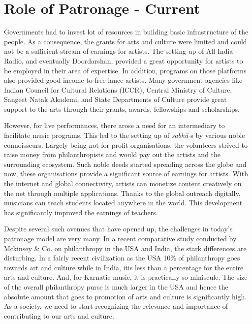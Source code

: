\vspace{-.3cm}

\section*{Role of Patronage - Current}

\vspace{-.2cm}

Governments had to invest lot of resources in building basic infrastructure of the people. As a consequence, the grants for arts and culture were limited and could not be a sufficient stream of earnings for artists. The setting up of All India Radio, and eventually Doordarshan, provided a great opportunity for artists to be employed in their area of expertise. In addition, programs on those platforms also provided good income to free-lance artists. Many government agencies like Indian Council for Cultural Relations (ICCR), Central Ministry of Culture, Sangeet Natak Akademi, and State Departments of Culture provide great support to the arts through their grants, awards, fellowships and scholarships.

However, for live performances, there arose a need for an intermediary to facilitate music programs. This led to the setting up of \textit{sabhā-}s by various noble connoisseurs. Largely being not-for-profit organisations, the volunteers strived to raise money from philanthropists and would pay out the artists and the surrounding ecosystem. Such noble deeds started spreading across the globe and now, these organisations provide a significant source of earnings for artists. With the internet and global connectivity, artists can monetize content creatively on the net through multiple applications. Thanks to the global outreach digitally, musicians can teach students located anywhere in the world. This development has significantly improved the earnings of teachers.

Despite several such avenues that have opened up, the challenges in today’s patronage model are very many. In a recent comparative study conducted by Mckinsey \& Co. on philanthropy in the USA and India, the stark differences are disturbing. In a fairly recent civilization as the USA 10\% of philanthropy goes towards art and culture while in India, itis less than a percentage for the entire arts and culture. And, for Karnatic music, it is practically so miniscule. The size of the overall philanthropy purse is much larger in the USA and hence the absolute amount that goes to promotion of arts and culture is significantly high. As a society, we need to start recognizing the relevance and importance of contributing to our arts and culture.

